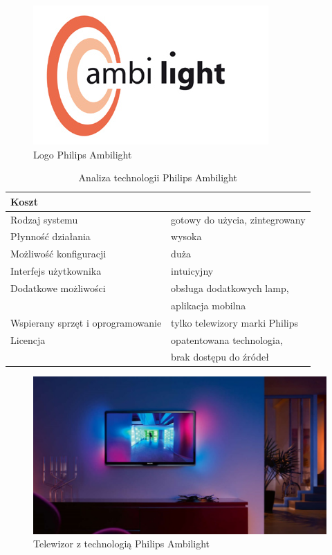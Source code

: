 \documentclass[12pt]{report}
\begin{document}
\begin{figure}[h]
\centering
\includegraphics[width=.7\textwidth]{../resources/ambilight.jpg}
\caption[Logo Philips Ambilight]{Logo Philips Ambilight \cite{ambilight}}
\end{figure}

\newpage

\begin{table}[h]
\centering
\begin{tabular}{| l | l |} 
\hline 
Koszt & \\ \hline
Rodzaj systemu & gotowy do użycia, zintegrowany \\ \hline
Płynność działania & wysoka \\ \hline
Możliwość konfiguracji & duża  \\ \hline
Interfejs użytkownika & intuicyjny  \\ \hline
Dodatkowe możliwości &  obsługa dodatkowych lamp, \\ \hline
&  aplikacja mobilna \\ \hline
Wspierany sprzęt i oprogramowanie &  tylko telewizory marki Philips   \\ \hline
Licencja & opatentowana technologia,  \\ \hline
& brak dostępu do źródeł  \\ \hline
\end{tabular} 
\caption{Analiza technologii Philips Ambilight}
\end{table}

\begin{figure}[h]
\centering
\includegraphics[width=\textwidth]{../resources/ambilight2.jpg}
\caption[Telewizor z technologią Philips Ambilight]{Telewizor z technologią Philips Ambilight \cite{ambilight2}}
\end{figure}
\end{document}
